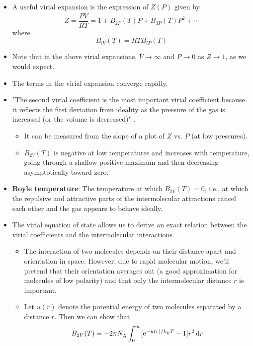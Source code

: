 \documentclass[../notes.tex]{subfiles}
\begin{document}
\begin{itemize}
    \item A useful virial expansion is the expression of $Z(P)$ given by
    \begin{equation*}
        Z = \frac{P\overline{V}}{RT}
        = 1+B_{2P}(T)P+B_{3P}(T)P^2+\cdots
    \end{equation*}
    where
    \begin{equation*}
        B_{iV}(T) = RTB_{iP}(T)
    \end{equation*}
    \item Note that in the above virial expansions, $\overline{V}\to\infty$ and $P\to 0$ as $Z\to 1$, as we would expect.
    \item The terms in the virial expansion converge rapidly.
    \item "The second virial coefficient is the most important virial coefficient because it reflects the first deviation from ideality as the pressure of the gas is increased (or the volume is decreased)" \parencite[659]{bib:McQuarrieSimon}.
    \begin{itemize}
        \item It can be measured from the slope of a plot of $Z$ vs. $P$ (at low pressures).
        \item $B_{2V}(T)$ is negative at low temperatures and increases with temperature, going through a shallow positive maximum and then decreasing asymptotically toward zero.
    \end{itemize}
    \item \textbf{Boyle temperature}: The temperature at which $B_{2V}(T)=0$, i.e., at which the repulsive and attractive parts of the intermolecular attractions cancel each other and the gas appears to behave ideally.
    \item The virial equation of state allows us to derive an exact relation between the virial coefficients and the intermolecular interactions.
    \begin{itemize}
        \item The interaction of two molecules depends on their distance apart and orientation in space. However, due to rapid molecular motion, we'll pretend that their orientation averages out (a good approximation for molecules of low polarity) and that only the intermolecular distance $r$ is important.
        \item Let $u(r)$ denote the potential energy of two molecules separated by a distance $r$. Then we can show that
        \begin{equation*}
            B_{2V}(T) = -2\pi\NA\int_0^\infty[\e[-u(r)/\kB T]-1]r^2\dd{r}

\end{equation*}
\end{itemize}
\end{itemize}
\end{document}
